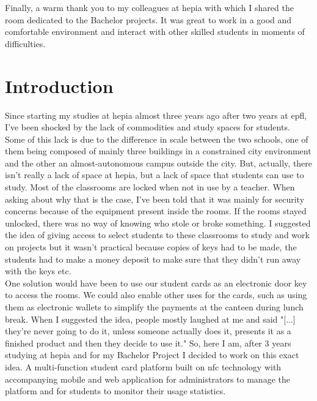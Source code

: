\documentclass[twoside, openright,11pt,a4paper]{book}
\begin{document}

Finally, a  warm thank you to my colleagues at hepia with which I shared the room dedicated to the Bachelor projects. It was great to work in a good and comfortable environment and interact with other skilled students in moments of difficulties.
\printglossary[title=Terms and Definitions]
\newpage
\mainmatter
\pagestyle{hepia-fancy}
\chapter{Introduction}
Since starting my studies at hepia almost three years ago after two years at \gls{epfl}, I've been shocked by the lack of commodities and study spaces for students. Some of this lack is due to the difference in scale between the two schools, one of them being composed of mainly three buildings in a constrained city environment and the other an almost-autonomous campus outside the city. But, actually, there isn't really a lack of space at hepia, but a lack of space that students can use to study. Most of the classrooms are locked when not in use by a teacher. When asking about why that is the case, I've been told that it was mainly for security concerns because of the equipment present inside the rooms. If the rooms stayed unlocked, there was no way of knowing who stole or broke something. I suggested the idea of giving access to select students to these classrooms to study and work on projects but it wasn't practical because copies of keys had to be made, the students had to make a money deposit to make sure that they didn't run away with the keys etc.\\ 

One solution would have been to use our student cards as an electronic door key to access the rooms. We could also enable other uses for the cards, such as using them as electronic wallets to simplify the payments at the canteen during lunch break. When I suggested the idea, people mostly laughed at me and said "[...] they're never going to do it, unless someone actually does it, presents it as a finished product and then they decide to use it." So, here I am, after 3 years studying at hepia and for my Bachelor Project I decided to work on this exact idea. A multi-function student card platform built on \gls{nfc} technology with accompanying mobile and web application for administrators to manage the platform and for students to monitor their usage statistics.
\end{document}
